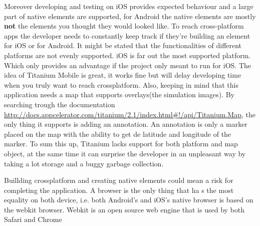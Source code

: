 Moreover developing and testing on iOS provides expected behaviour and a large part of native elements are supported, for Android the native elements are mostly \textbf{not} the elements you thought they would looked like. To reach cross-platform apps the developer needs to constantly keep track if they're building an element for iOS or for Android. It might be stated that the functionalities of different platforms are not evenly supported. iOS is far out the most supported platform. Which only provides an advantage if the project only meant to run for iOS. The idea of Titanium Mobile is great, it works fine but will delay developing time when you truly want to reach crossplatform. Also, keeping in mind that this application needs a map that supports overlays(the simulation images). By searching trough the documentation \url{http://docs.appcelerator.com/titanium/2.1/index.html#!/api/Titanium.Map}, the only thing it supports is adding an annotation. An annotation is only a marker placed on the map with the ability to get de latitude and longitude of the marker. To sum this up, Titanium lacks support for both platform and map object, at the same time it can surprise the developer in an unpleasant  way by taking a lot storage and a buggy garbage collection.

Buillding crossplatform and creating native elements could mean a risk for completing the application. A browser is the only thing that ha s the most equality on both device, i.e. both Android's and iOS's native browser is based on the webkit browser. Webkit is an open source web engine that is used by both Safari and Chrome
